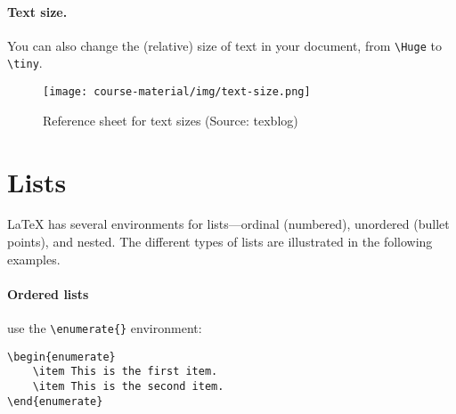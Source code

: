 \documentclass[11pt]{article}
\begin{document}
\paragraph{Text size.} You \normalsize can also change the (relative) size of text in your document, from \Huge \verb|\Huge| \normalsize to \tiny \verb|\tiny|. \normalsize

\begin{figure}[H]
    \centering
    \texttt{[image: course-material/img/text-size.png]}
    \caption{Reference sheet for text sizes (Source: texblog)}
    \label{fig:textsize}
\end{figure}



\section*{Lists}

{\LaTeX} has several environments for lists---ordinal (numbered), unordered (bullet points), and nested. The different types of lists are illustrated in the following examples.

\paragraph{Ordered lists} use the \verb|\enumerate{}| environment:
\begin{lstlisting}
\begin{enumerate}
    \item This is the first item.
    \item This is the second item.
\end{enumerate}
\end{lstlisting}
\end{document}
